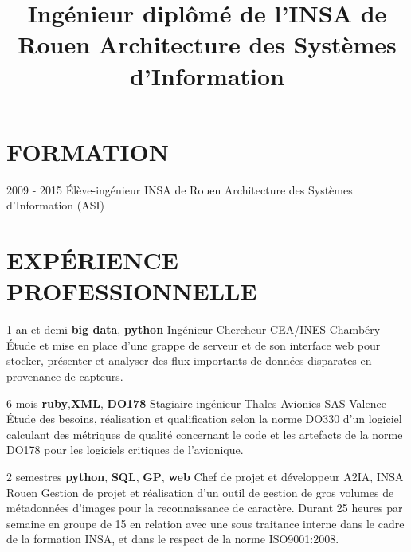 \documentclass[11pt,a4paper]{moderncv}
\title{
  Ingénieur diplômé de l'INSA de Rouen \newline{}
  Architecture des Systèmes d'Information
}
\begin{document}
  \maketitle

  \section{FORMATION}

  \cventry
    {2009 - 2015}
    {Élève-ingénieur}
    {INSA de Rouen}
    {Architecture des Systèmes d'Information (ASI)}
    {}{}

  \section{EXPÉRIENCE PROFESSIONNELLE}

  \cventry
    {1 an et demi \textbf{big data}, \textbf{python}}
    {Ingénieur-Chercheur}
    {CEA/INES}
    {Chambéry}
    {}{
      Étude et mise en place d'une grappe de serveur et de son interface web
      pour stocker, présenter et analyser des flux importants de données
      disparates en provenance de capteurs.
    }

  \cventry
    {6 mois \textbf{ruby},\textbf{XML}, \textbf{DO178}}
    {Stagiaire ingénieur}
    {Thales Avionics SAS}
    {Valence}
    {}{
      Étude des besoins, réalisation et qualification selon la norme DO330
      d'un logiciel calculant des métriques de qualité concernant le code et
      les artefacts de la norme DO178 pour les logiciels critiques de
      l'avionique.
    }

  \cventry
    {2 semestres \textbf{python}, \textbf{SQL}, \textbf{GP}, \textbf{web}}
    {Chef de projet et développeur}
    {A2IA, INSA}
    {Rouen}
    {}{
      Gestion de projet et réalisation d'un outil de gestion de gros volumes de
      métadonnées d'images pour la reconnaissance de caractère. Durant 25
      heures par semaine en groupe de 15 en relation avec une sous traitance
      interne dans le cadre de la formation INSA, et dans le respect de la
      norme ISO9001:2008.
    }

\end{document}

